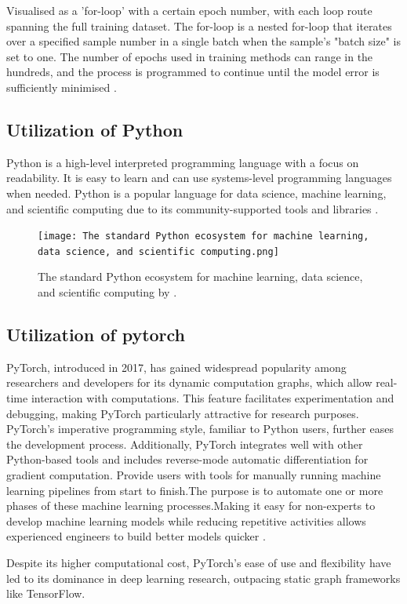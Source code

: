 \documentclass[conference]{IEEEtran}
\begin{document}
Visualised as a 'for-loop' with a certain epoch number, with each loop route spanning the full training dataset. The for-loop is a nested for-loop that iterates over a specified sample number in a single batch when the sample's "batch size" is set to one. The number of epochs used in training methods can range in the hundreds, and the process is programmed to continue until the model error is sufficiently minimised \cite{b8}.
\subsection{Utilization of Python}
Python is a high-level interpreted programming language with a focus on readability. It is easy to learn and can use systems-level programming languages when needed. Python is a popular language for data science, machine learning, and scientific computing due to its community-supported tools and libraries \cite{b9}.

\begin{figure}[h]
    \centering
    \texttt{[image: The standard Python ecosystem for machine learning, data science, and scientific computing.png]}
    \caption{The standard Python ecosystem for machine learning, data science, and scientific computing by \cite{b9}.}
    \label{fig}
\end{figure}

\subsection{Utilization of pytorch}
PyTorch, introduced in 2017, has gained widespread popularity among researchers and developers for its dynamic computation graphs, which allow real-time interaction with computations. This feature facilitates experimentation and debugging, making PyTorch particularly attractive for research purposes. PyTorch's imperative programming style, familiar to Python users, further eases the development process. Additionally, PyTorch integrates well with other Python-based tools and includes reverse-mode automatic differentiation for gradient computation. Provide users with tools for manually running machine learning pipelines from start to finish.The purpose is to automate one or more phases of these machine learning processes.Making it easy for non-experts to develop machine learning models while reducing repetitive activities allows experienced engineers to build better models quicker \cite{b9}.

Despite its higher computational cost, PyTorch's ease of use and flexibility have led to its dominance in deep learning research, outpacing static graph frameworks like TensorFlow.
\end{document}
